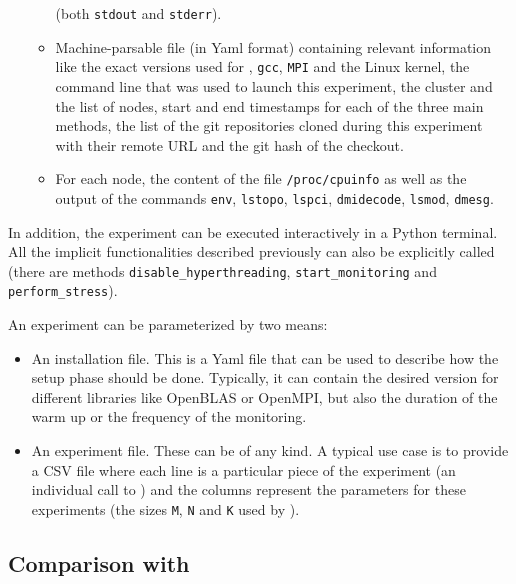 \begin{itemize}
\begin{itemize}
                            (both \texttt{stdout} and \texttt{stderr}).
                        \item Machine-parsable file (in Yaml format) containing relevant information like
                            the exact versions used for \peanut, \texttt{gcc}, \texttt{MPI} and the Linux
                            kernel, the command line that was used to launch this experiment, the cluster and the list
                            of nodes, start and end timestamps for each of the three main methods, the list of the git
                            repositories cloned during this experiment with their remote URL and the git hash of the
                            checkout.
                        \item For each node, the content of the file \texttt{/proc/cpuinfo} as well as the output of the
                            commands \texttt{env}, \texttt{lstopo}, \texttt{lspci}, \texttt{dmidecode},
                            \texttt{lsmod}, \texttt{dmesg}.
                    \end{itemize}
            \end{itemize}
            In addition, the experiment can be executed interactively in a Python terminal. All the implicit
            functionalities described previously can also be explicitly called (\eg there are methods
            \texttt{disable\_hyperthreading}, \texttt{start\_monitoring} and \texttt{perform\_stress}).

            An experiment can be parameterized by two means:
            \begin{itemize}
                \item An installation file. This is a Yaml file that can be used to describe how the setup phase should
                    be done. Typically, it can contain the desired version for different libraries like OpenBLAS or
                    OpenMPI, but also the duration of the warm up or the frequency of the monitoring.
                \item An experiment file. These can be of any kind. A typical use case is to provide a CSV file where
                    each line is a particular piece of the experiment (\eg an individual call to \dgemm) and the
                    columns represent the parameters for these experiments (\eg the sizes \texttt{M}, \texttt{N} and
                    \texttt{K} used by \dgemm).
            \end{itemize}

        \subsection{Comparison with \execo}%
        \label{sub:comparison_with_execo}

